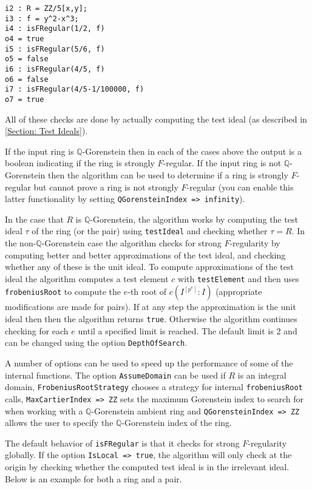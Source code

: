 \documentclass{amsart}
\begin{document}
\medskip
\begin{verbatim}
i2 : R = ZZ/5[x,y];
i3 : f = y^2-x^3;
i4 : isFRegular(1/2, f)
o4 = true
i5 : isFRegular(5/6, f)
o5 = false
i6 : isFRegular(4/5, f)
o6 = false
i7 : isFRegular(4/5-1/100000, f)
o7 = true
\end{verbatim}
\medskip

All of these checks are done by actually computing the test ideal (as described in \autoref{Section: Test Ideals}).

If the input ring is $\mathbb{Q}$-Gorenstein then in each of the cases above the output is a boolean indicating if the
ring is strongly $F$-regular. If the input ring is not
$\mathbb{Q}$-Gorenstein then the algorithm can be used to determine if a
ring is strongly $F$-regular but cannot prove a ring is not strongly
$F$-regular (you can enable this latter functionality by setting \texttt{QGorensteinIndex => infinity}).


In the case that $R$ is $\mathbb{Q}$-Gorenstein, the algorithm works by
computing the test ideal $\tau$ of the ring  (or the pair) using \texttt{testIdeal}
and checking whether $\tau=R$.
In the non-$\mathbb{Q}$-Gorenstein case the algorithm checks for
strong $F$-regularity by computing better and
better approximations of the test ideal, and checking whether any of these is the unit ideal.
To compute approximations of the
test ideal the algorithm computes a test element $c$ with \texttt{testElement}
and then uses \texttt{frobeniusRoot} to compute the $e$-th root of
$c(I^{[p^{e}]} : I)$ (appropriate modifications are made for pairs). If at
any step the approximation is the unit ideal then then the algorithm
returns \texttt{true}. Otherwise the algorithm continues checking for each $e$
until a specified limit is reached. The default limit is 2 and can be
changed using the option \texttt{DepthOfSearch}.


A number of options can be used to speed up the performance of some of the
internal functions. The option \texttt{AssumeDomain} can be used if $R$ is an
integral domain, \texttt{FrobeniusRootStrategy} chooses a strategy for
internal \texttt{frobeniusRoot} calls, \texttt{MaxCartierIndex => ZZ} sets the
maximum Gorenstein index to search for when working with a
$\mathbb{Q}$-Gorenstein ambient ring and \texttt{QGorensteinIndex => ZZ}
allows the user to specify the $\mathbb{Q}$-Gorenstein index of the ring.


The default behavior of \texttt{isFRegular} is that it checks for strong $F$-regularity
globally. If the option \texttt{IsLocal => true}, the algorithm will only
check at the origin by checking whether the computed test ideal is in the irrelevant ideal.
Below is an example for both a ring and a pair.
\end{document}
